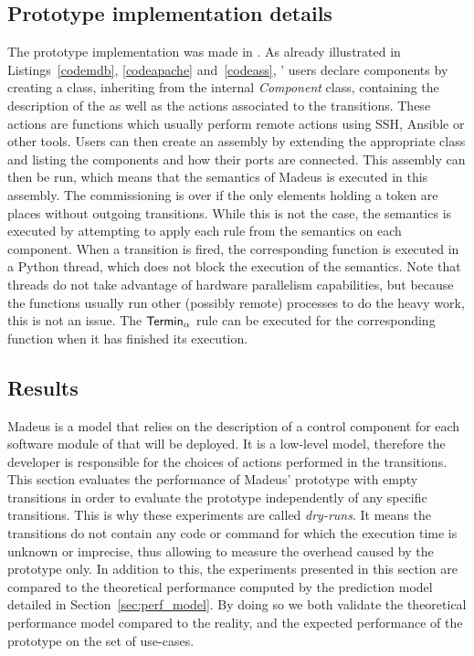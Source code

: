 \subsection{Prototype implementation details}
The prototype implementation was made in \python. As already
illustrated in Listings~\ref{codemdb}, \ref{codeapache}
and~\ref{codeass}, \mad' users declare components by creating a class,
inheriting from the internal \emph{Component} class, containing the
description of the \net as well as the actions associated to the
transitions. These actions are \python functions which usually perform
remote actions using SSH, Ansible or other tools. Users can then
create an assembly by extending the appropriate class and listing the
components and how their ports are connected. This assembly can then
be run, which means that the semantics of Madeus is executed in this
assembly. The commissioning is over if the only elements holding a
token are places without outgoing transitions. While this is not the
case, the semantics is executed by attempting to apply each rule from
the semantics on each component. When a transition is fired, the
corresponding \python function is executed in a Python thread, which
does not block the execution of the semantics. Note that \python
threads do not take advantage of hardware parallelism capabilities,
but because the functions usually run other (possibly remote)
processes to do the heavy work, this is not an issue. The
$\mathsf{Termin}_\alpha$ rule can be executed for the corresponding function
when it has finished its execution.

\subsection{Results}

Madeus is a model that relies on the description of a control
component for each software module of that will be deployed. It is a
low-level model, therefore the developer is responsible for the
choices of actions performed in the transitions.  This section
evaluates the performance of Madeus' prototype with empty transitions
in order to evaluate the \mad prototype independently of any specific
transitions. This is why these experiments are called
\emph{dry-runs}. It means the transitions do not contain any code or
command for which the execution time is unknown or imprecise, thus
allowing to measure the overhead caused by the prototype only. In
addition to this, the experiments presented in this section are
compared to the theoretical performance computed by the prediction
model detailed in Section~\ref{sec:perf_model}. By doing so we both
validate the theoretical performance model compared to the reality,
and the expected performance of the prototype on the set of use-cases.

